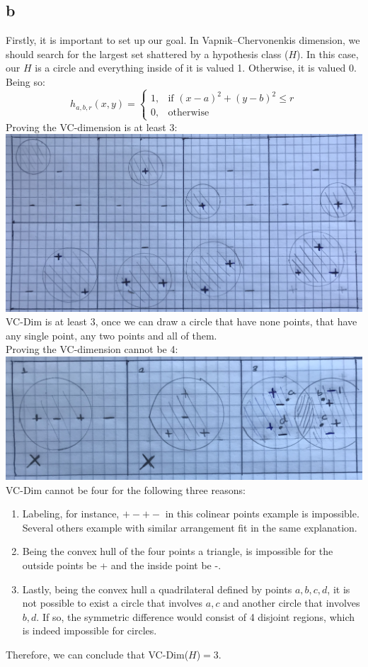 \subsection*{b}
Firstly, it is important to set up our goal. In Vapnik–Chervonenkis dimension, we should search for the largest set shattered by a hypothesis class ($H$). In this case, our $H$ is a circle and everything inside of it is valued 1. Otherwise, it is valued 0. Being so: \\
$$
h_{a,b,r}(x,y)=
        \begin{cases}
			1, & \text{if $(x-a)^2+(y-b)^2 \leq r$}\\
            0, & \text{otherwise}
		 \end{cases}
$$
\bigbreak
Proving the VC-dimension is at least 3:\\
\bigbreak
\includegraphics[width=\textwidth,height=\textheight,keepaspectratio]{3dim.jpg}\\
\bigbreak
VC-Dim is at least 3, once we can  draw a circle that have none points, that have any single point, any two points and all of them.\\
\bigbreak
Proving the VC-dimension cannot be 4:\\
\bigbreak
\includegraphics[width=\textwidth,height=\textheight,keepaspectratio]{4dim.jpg}
\bigbreak
VC-Dim cannot be four for the following three reasons:
\begin{enumerate}
  \item Labeling, for instance, $+ - + -$ in this colinear points example is impossible. Several others example with similar arrangement fit in the same explanation. 
  \item Being the convex hull of the four points a triangle, is impossible for the outside points be + and the inside point be -.
  \item Lastly, being the convex hull a quadrilateral defined by points {$a,b,c,d$}, it is not possible to exist a circle that involves $a,c$ and another circle that involves $b,d$. If so, the symmetric difference would consist of 4 disjoint regions, which is indeed impossible for circles.
\end{enumerate}
\bigbreak
Therefore, we can conclude that VC-Dim($H$)$ = 3$. 
